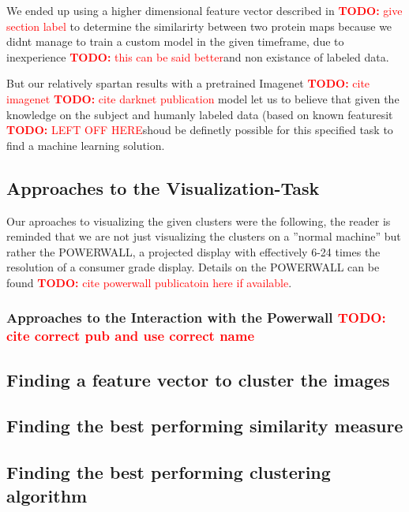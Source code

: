 \documentclass[journal]{vgtc}       %
\newcommand{\todo}[1]{\textcolor{red}{\textbf{TODO:} #1}}
\begin{document}
We ended up using a higher dimensional feature vector described in \todo{give section label} to determine the similarirty between two protein maps because we didnt manage to train a custom model in the given timeframe, due to inexperience \todo{this can be said better}and non existance of labeled data.

But our relatively spartan results with a pretrained Imagenet \todo{cite imagenet} \todo{cite darknet publication} model let us to believe that given the knowledge on the subject and humanly labeled data (based on known featuresit \todo{LEFT OFF HERE}shoud be definetly possible for this specified task to find a machine learning solution. 

\subsection{Approaches to the Visualization-Task}

Our aproaches to visualizing the given clusters were the following, the reader is reminded that we are not just visualizing the clusters on a ''normal machine'' but rather the POWERWALL, a projected display with effectively 6-24 times the resolution of a consumer grade display. Details on the POWERWALL can be found \todo{cite powerwall publicatoin here if available}.


\subsubsection{Approaches to the Interaction with the Powerwall \todo{cite correct pub and use correct name}}


\subsection{Finding a feature vector to cluster the images}

\subsection{Finding the best performing similarity measure}
\subsection{Finding the best performing clustering algorithm}
\end{document}
